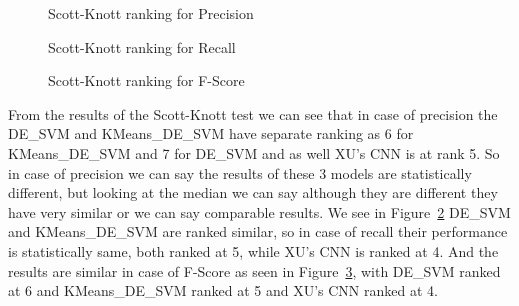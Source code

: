 \documentclass[sigconf]{acmart}
\theoremstyle{break}
\begin{document}
    \begin{figure}
        \centering
        \caption{Scott-Knott ranking for Precision}
        \label{fig:Scott-Knott ranking for Precision}
    \end{figure}
    
    \begin{figure}
        \centering
        \caption{Scott-Knott ranking for Recall}
        \label{fig:Scott-Knott ranking for Recall}
    \end{figure}
    
    \begin{figure}
        \centering
        \caption{Scott-Knott ranking for F-Score}
        \label{fig:Scott-Knott ranking for F-Score}
    \end{figure}

    From the results of the Scott-Knott test we can see that in case of precision the DE\_SVM and KMeans\_DE\_SVM have separate ranking as 6 for  KMeans\_DE\_SVM and 7 for DE\_SVM and as well XU's CNN is at rank 5. So in case of precision we can say the results of these 3 models are statistically different, but looking at the median we can say although they are different they have very similar or we can say comparable results. We see in Figure~\ref{fig:Scott-Knott ranking for Recall} DE\_SVM and KMeans\_DE\_SVM are ranked similar, so in case of recall their performance is statistically same, both ranked at 5, while XU's CNN is ranked at 4. And the results are similar in case of F-Score as seen in Figure~\ref{fig:Scott-Knott ranking for F-Score}, with DE\_SVM ranked at 6 and KMeans\_DE\_SVM ranked at 5 and XU's CNN ranked at 4.
    
\end{document}
